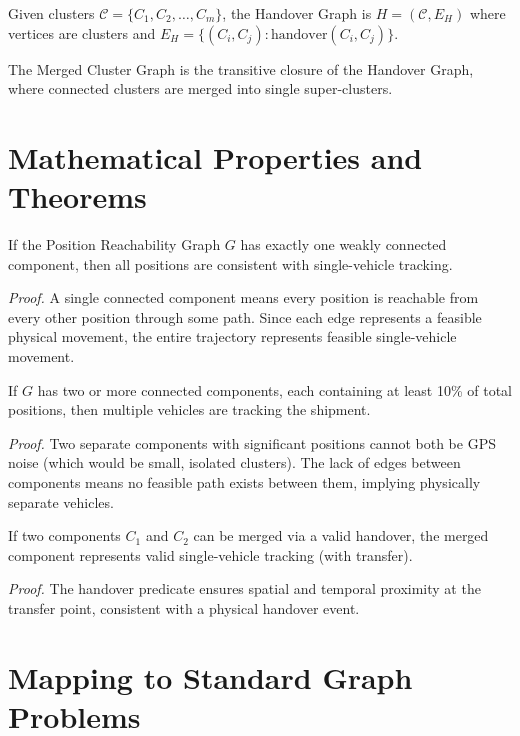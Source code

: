 \begin{definition}
Given clusters $\mathcal{C} = \{C_1, C_2, \ldots, C_m\}$, the Handover Graph is $H = (\mathcal{C}, E_H)$ where vertices are clusters and $E_H = \{(C_i, C_j) : \mathrm{handover}(C_i, C_j)\}$.
\end{definition}

\begin{definition}
The Merged Cluster Graph is the transitive closure of the Handover Graph, where connected clusters are merged into single super-clusters.
\end{definition}

\section{Mathematical Properties and Theorems}

\begin{theorem}
If the Position Reachability Graph $G$ has exactly one weakly connected component, then all positions are consistent with single-vehicle tracking.
\end{theorem}
\textit{Proof.} A single connected component means every position is reachable from every other position through some path. Since each edge represents a feasible physical movement, the entire trajectory represents feasible single-vehicle movement.

\begin{theorem}
If $G$ has two or more connected components, each containing at least 10\% of total positions, then multiple vehicles are tracking the shipment.
\end{theorem}
\textit{Proof.} Two separate components with significant positions cannot both be GPS noise (which would be small, isolated clusters). The lack of edges between components means no feasible path exists between them, implying physically separate vehicles.

\begin{theorem}
If two components $C_1$ and $C_2$ can be merged via a valid handover, the merged component represents valid single-vehicle tracking (with transfer).
\end{theorem}
\textit{Proof.} The handover predicate ensures spatial and temporal proximity at the transfer point, consistent with a physical handover event.

\section{Mapping to Standard Graph Problems}

